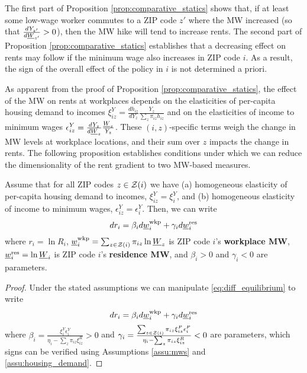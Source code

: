 The first part of Proposition \ref{prop:comparative_statics} shows that,
if at least some low-wage worker commutes to a ZIP code $z'$ where the MW 
increased  (so that $\frac{d Y_{z'}}{d \underline{W}_{z'}}>0$),
then the MW hike will tend to increase rents.
The second part of Proposition \ref{prop:comparative_statics} establishes that 
a decreasing effect on rents may follow if the minimum wage also increases in 
ZIP code $i$.
As a result, the sign of the overall effect of the policy in $i$ is not 
determined a priori.

As apparent from the proof of Proposition \ref{prop:comparative_statics}, 
the effect of the MW on rents at workplaces depends on the elasticities of 
per-capita housing demand to incomes
$\xi^Y_{iz} = \frac{d h_{iz}}{d Y_z} \frac{Y_z}{\sum_z \pi_{iz} h_{iz}}$ and
on the elasticities of income to minimum wages
$\epsilon_{iz}^Y = \frac{d Y_z}{d \underline{W}_z} \frac{\underline{W}_z}{Y_z}$.
These $(i,z)$-specific terms weigh the change in MW levels at workplace locations,
and their sum over $z$ impacts the change in rents.
The following proposition establishes conditions under which we can reduce the 
dimensionality of the rent gradient to two MW-based measures.

\begin{prop}[Representation]\label{prop:representation}
    Assume that for all ZIP codes $z\in\mathcal{Z}(i)$ we have
    (a) homogeneous elasticity of per-capita housing demand to incomes,
    $\xi^Y_{iz}=\xi^Y_{i}$, and
    (b) homogeneous elasticity of income to minimum wages,
    $\epsilon_{iz}^Y=\epsilon_i^Y$.
    Then, we can write
    $$
    d r_{i} = \beta_i d \underline{w}_{i}^{\text{wkp}} + \gamma_i d \underline{w}^{\text{res}}_i
    $$
    where 
    $r_{i} = \ln R_i$,
    $\underline{w}_{i}^{\text{wkp}} = \sum_{z\in\mathcal{Z}(i)} \pi_{iz} \ln \underline{W}_z$ 
    is ZIP code $i$'s \textbf{workplace MW}, 
    $\underline{w}^{\text{res}}_i = \ln \underline{W}_i$ 
    is ZIP code $i$'s \textbf{residence MW}, and 
    $\beta_i > 0$ and $\gamma_i < 0$ are parameters.
\end{prop}
\begin{proof}
    Under the stated assumptions we can manipulate \eqref{eq:diff_equilibrium} 
    to write
    \begin{equation} \label{eq:theory_representation}
        d r_i = \beta_i  d \underline{w}^{\text{wkp}}_i
              + \gamma_i d \underline{w}^{\text{res}}_i
    \end{equation}
    where
    $\beta_i = \frac{\xi_{i}^{Y}\epsilon_i^{Y}}
                     {\eta_{i} - \sum_z \pi_{iz} \xi_{iz}^R} 
              > 0$ and
    $\gamma_i = \frac{\sum_{z\in\mathcal{Z}(i)}\pi_{iz}\xi_{iz}^{P}\epsilon_{i}^{P}}
                    {\eta_{i} - \sum_z \pi_{iz} \xi_{iz}^R} 
              < 0$
    are parameters, which signs can be verified using
    Assumptions \ref{assu:mws} and \ref{assu:housing_demand}.
\end{proof}

